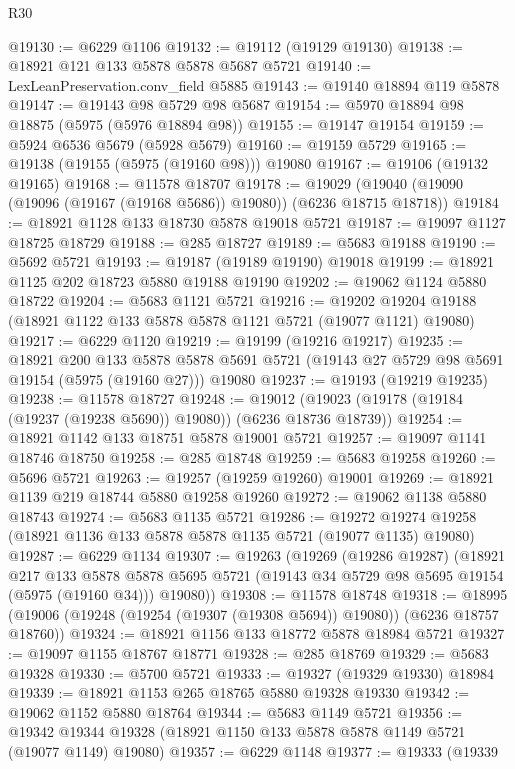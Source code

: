 \begin{lexlean}{R30}
\begin{coremodule}
@19130 := @6229 @1106
@19132 := @19112 (@19129 @19130)
@19138 := @18921 @121 @133 @5878 @5878 @5687 @5721
@19140 := LexLeanPreservation.conv_field @5885
@19143 := @19140 @18894 @119 @5878
@19147 := @19143 @98 @5729 @98 @5687
@19154 := @5970 @18894 @98 @18875 (@5975 (@5976 @18894 @98))
@19155 := @19147 @19154
@19159 := @5924 @6536 @5679 (@5928 @5679)
@19160 := @19159 @5729
@19165 := @19138 (@19155 (@5975 (@19160 @98))) @19080
@19167 := @19106 (@19132 @19165)
@19168 := @11578 @18707
@19178 := @19029 (@19040 (@19090 (@19096 (@19167 (@19168 @5686)) @19080)) (@6236 @18715 @18718))
@19184 := @18921 @1128 @133 @18730 @5878 @19018 @5721
@19187 := @19097 @1127 @18725 @18729
@19188 := @285 @18727
@19189 := @5683 @19188
@19190 := @5692 @5721
@19193 := @19187 (@19189 @19190) @19018
@19199 := @18921 @1125 @202 @18723 @5880 @19188 @19190
@19202 := @19062 @1124 @5880 @18722
@19204 := @5683 @1121 @5721
@19216 := @19202 @19204 @19188 (@18921 @1122 @133 @5878 @5878 @1121 @5721 (@19077 @1121) @19080)
@19217 := @6229 @1120
@19219 := @19199 (@19216 @19217)
@19235 := @18921
    @200
    @133
    @5878
    @5878
    @5691
    @5721
    (@19143 @27 @5729 @98 @5691 @19154 (@5975 (@19160 @27)))
    @19080
@19237 := @19193 (@19219 @19235)
@19238 := @11578 @18727
@19248 := @19012 (@19023 (@19178 (@19184 (@19237 (@19238 @5690)) @19080)) (@6236 @18736 @18739))
@19254 := @18921 @1142 @133 @18751 @5878 @19001 @5721
@19257 := @19097 @1141 @18746 @18750
@19258 := @285 @18748
@19259 := @5683 @19258
@19260 := @5696 @5721
@19263 := @19257 (@19259 @19260) @19001
@19269 := @18921 @1139 @219 @18744 @5880 @19258 @19260
@19272 := @19062 @1138 @5880 @18743
@19274 := @5683 @1135 @5721
@19286 := @19272 @19274 @19258 (@18921 @1136 @133 @5878 @5878 @1135 @5721 (@19077 @1135) @19080)
@19287 := @6229 @1134
@19307 := @19263
    (@19269
      (@19286 @19287)
      (@18921
        @217
        @133
        @5878
        @5878
        @5695
        @5721
        (@19143 @34 @5729 @98 @5695 @19154 (@5975 (@19160 @34)))
        @19080))
@19308 := @11578 @18748
@19318 := @18995 (@19006 (@19248 (@19254 (@19307 (@19308 @5694)) @19080)) (@6236 @18757 @18760))
@19324 := @18921 @1156 @133 @18772 @5878 @18984 @5721
@19327 := @19097 @1155 @18767 @18771
@19328 := @285 @18769
@19329 := @5683 @19328
@19330 := @5700 @5721
@19333 := @19327 (@19329 @19330) @18984
@19339 := @18921 @1153 @265 @18765 @5880 @19328 @19330
@19342 := @19062 @1152 @5880 @18764
@19344 := @5683 @1149 @5721
@19356 := @19342 @19344 @19328 (@18921 @1150 @133 @5878 @5878 @1149 @5721 (@19077 @1149) @19080)
@19357 := @6229 @1148
@19377 := @19333
    (@19339

\end{coremodule}
\end{lexlean}

